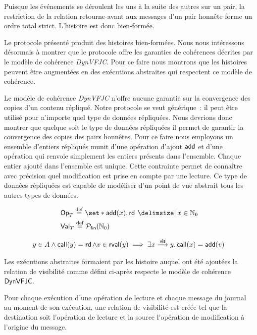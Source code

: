 Puisque les événements se déroulent les uns à la suite des autres sur un pair, la restriction de la relation retourne-avant aux messages d'un pair honnête forme un ordre total strict.
L'histoire est donc bien-formée.

Le protocole présenté produit des histoires bien-formées.
Nous nous intéressons désormais à montrer que le protocole offre les garanties de cohérences décrites par le modèle de cohérence \emph{DynVFJC}.
Pour ce faire nous montrons que les histoires peuvent être augmentées en des exécutions abstraites qui respectent ce modèle de cohérence.

Le modèle de cohérence \emph{DynVFJC} n'offre aucune garantie sur la convergence des copies d'un contenu répliqué.
Notre protocole se veut générique~: il peut être utilisé pour n'importe quel type de données répliquées.
Nous devrions donc montrer que quelque soit le type de données répliquées il permet de garantir la convergence des copies des pairs honnêtes.
Pour ce faire nous employons un ensemble d'entiers répliqués munit d'une opération d'ajout $\operatorname{\mathsf{add}}$ et d'une opération qui renvoie simplement les entiers présents dans l'ensemble.
Chaque entier ajouté dans l'ensemble est unique.
Cette contrainte permet de connaître avec précision quel modification est prise en compte par une lecture.
Ce type de données répliquées est capable de modéliser d'un point de vue abstrait tous les autres types de données.

\begin{align*}
    &\trm{Op}_T \defeq \set*{\trm{add}(x), \trm{rd} \given x \in \mathbb{N}_0}\\
    &\trm{Val}_T \defeq \powerfset{\mathbb{N}_0}
\end{align*}

\begin{equation*}
    y \in A \land \operatorname{\mathsf{call}}(y) = \operatorname{\mathsf{rd}} \land v \in \operatorname{\mathsf{rval}}(y) \implies \exists x \overset{\mathsf{vis}}{\longrightarrow} y \ldotp \operatorname{\mathsf{call}}(x) = \operatorname{\mathsf{add}}(v)
\end{equation*}

Les exécutions abstraites formaient par les histoire auquel ont été ajoutées la relation de visibilité comme défini ci-après respecte le modèle de cohérence $\operatorname{\mathsf{DynVFJC}}$.

Pour chaque exécution d'une opération de lecture et chaque message du journal au moment de son exécution, une relation de visibilité est créée tel que la destination soit l'opération de lecture et la source l'opération de modification à l'origine du message.


